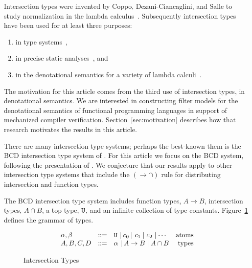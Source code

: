 \documentclass{article}
\begin{document}
Intersection types were invented by Coppo, Dezani-Ciancaglini, and
Salle to study normalization in the lambda
calculus~\citep{Coppo:1979aa}. Subsequently intersection types have
been used for at least three purposes:
\begin{enumerate}
  \item in type systems~\citep{Reynolds:1988aa,Pierce:1991aa,Castagna:2014aa,Chaudhuri:2014aa,Oliveira:2016aa,Amin:2017aa,Muehlboeck:2018aa,Bi:2019aa,Dunfield:2019aa,Microsoft:TypeScript2020aa},
  \item in precise static
    analyses~\citep{Turbak:1997aa,Palsberg:1998aa,Mossin:2003aa,Simoes:2007aa},
    and
  \item in the denotational semantics for a variety of lambda
    calculi~\citep{Coppo:1980ab,Coppo:1981aa,Coppo:1984aa,Honsell:1992aa,Abramsky:1993fk,Honsell:1999aa,Ishihara:2002aa,Rocca:2004aa,Dezani-Ciancaglini:2005aa,Alessi:2006aa,Barendregt:2013aa}.
\end{enumerate}
The motivation for this article comes from the third use of
intersection types, in denotational semantics. We are interested in
constructing filter models for the denotational semantics of
functional programming languages in support of mechanized compiler
verification. Section~\ref{sec:motivation} describes how that research
motivates the results in this article.

There are many intersection type systems; perhaps the best-known them
is the BCD intersection type system of \citet{Barendregt:1983aa}. For
this article we focus on the BCD system, following the presentation of
\citet{Barendregt:2013aa}. We conjecture that our results apply to
other intersection type systems that include the $({\to}{\cap})$ rule
for distributing intersection and function types.

The BCD intersection type system includes function types, $A \to B$,
intersection types, $A \cap B$, a top type, $\mathtt{U}$, and an infinite
collection of type constants. Figure~\ref{fig:types} defines the
grammar of types.

\begin{figure}[tbp]
  \[
  \begin{array}{lclr}
    \alpha,\beta & ::= & \mathtt{U} \mid c_0 \mid c_1 \mid c_2 \mid \cdots & \text{atoms}\\
    A,B,C,D & ::= & \alpha \mid A \to B \mid A \cap B & \text{types}
  \end{array}
  \]
  \caption{Intersection Types}
  \label{fig:types}
\end{figure}
\end{document}
